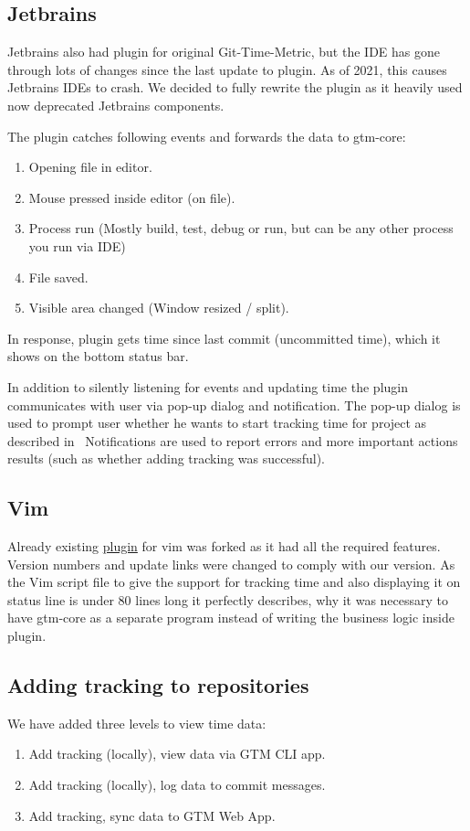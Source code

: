 \subsection{Jetbrains}\label{subsec:jetbrains-plugin}
Jetbrains also had plugin for original Git-Time-Metric, but the IDE has gone through lots of changes since the last update to plugin.
As of 2021, this causes Jetbrains IDEs to crash.
We decided to fully rewrite the plugin as it heavily used now deprecated Jetbrains components.

The plugin catches following events and forwards the data to gtm-core:
\begin{enumerate}
    \item Opening file in editor.
    \item Mouse pressed inside editor (on file).
    \item Process run (Mostly build, test, debug or run, but can be any other process you run via IDE)
    \item File saved.
    \item Visible area changed (Window resized / split).
\end{enumerate}

In response, plugin gets time since last commit (uncommitted time), which it shows on the bottom status bar.

In addition to silently listening for events and updating time the plugin communicates with user via pop-up dialog and notification.
The pop-up dialog is used to prompt user whether he wants to start tracking time for project as described in~
Notifications are used to report errors and more important actions results (such as whether adding tracking was successful).

\subsection{Vim}\label{subsec:vim-plugin}
Already existing \href{https://github.com/git-time-metric/gtm-vim-plugin}{plugin} for vim was forked as it had all the required features.
Version numbers and update links were changed to comply with our version.
As the Vim script file to give the support for tracking time and also displaying it on status line is under 80 lines long
it perfectly describes, why it was necessary to have gtm-core as a separate program instead of writing the business logic inside plugin.


\subsection{Adding tracking to repositories}\label{subsec:adding-tracking}
We have added three levels to view time data:
\begin{enumerate}
    \item Add tracking (locally), view data via GTM CLI app.
    \item Add tracking (locally), log data to commit messages.
    \item Add tracking, sync data to GTM Web App.
\end{enumerate}

